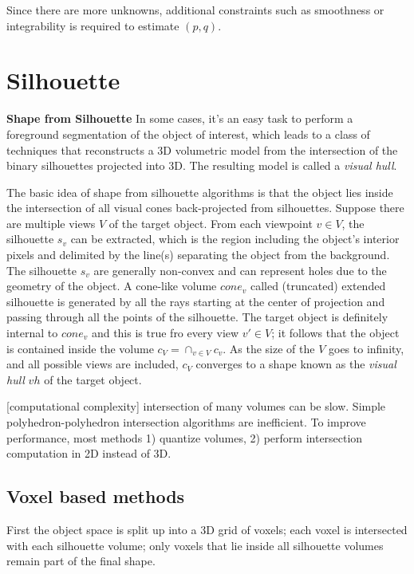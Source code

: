 Since there are more unknowns, additional constraints such as smoothness or integrability is required to estimate $(p, q)$.

\section{Silhouette}
\textbf{Shape from Silhouette}
In some cases, it's an easy task to perform a foreground segmentation of the object of interest, which leads to a class of techniques that reconstructs a 3D volumetric model from the intersection of the binary silhouettes projected into 3D. The resulting model is called a \textit{visual hull}.

The basic idea of shape from silhouette algorithms is that the object lies inside the intersection of all visual cones back-projected from silhouettes. Suppose there are multiple views $V$ of the target object. From each viewpoint $v\in V$, the silhouette $s_v$ can be extracted, which is the region including the object's interior pixels and delimited by the line(s) separating the object from the background. The silhouette $s_v$ are generally non-convex and can represent holes due to the geometry of the object. A cone-like volume $cone_v$ called (truncated) extended silhouette is generated by all the rays starting at the center of projection and passing through all the points of the silhouette. The target object is definitely internal to $cone_v$ and this is true fro every view $v'\in V$; it follows that the object is contained inside the volume $c_V=\cap_{v\in V}c_v$. As the size of the $V$ goes to infinity, and all possible views are included, $c_V$ converges to a shape known as the \textit{visual hull} $vh$ of the target object.



[computational complexity] intersection of many volumes can be slow. Simple polyhedron-polyhedron intersection algorithms are inefficient. To improve performance, most methods 1) quantize volumes, 2) perform intersection computation in 2D instead of 3D.

\subsection{Voxel based methods}
First the object space is split up into a 3D grid of voxels; each voxel is intersected with each silhouette volume; only voxels that lie inside all silhouette volumes remain part of the final shape.

